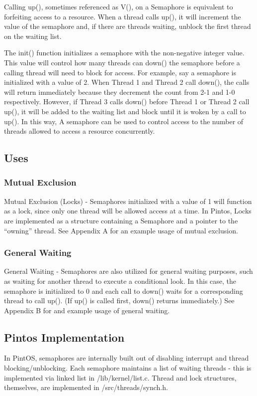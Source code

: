 \documentclass[11pt, letterpaper]{article}
\begin{document}
Calling up(), sometimes referenced as V(), on a Semaphore is equivalent to forfeiting access to a resource. When a thread calls up(), it will increment the value of the semaphore and, if there are threads waiting, unblock the first thread on the waiting list.

The init() function initializes a semaphore with the non-negative integer value. This value will control how many threads can down() the semaphore before a calling thread will need to block for access. For example, say a semaphore is initialized with a value of 2. When Thread 1 and Thread 2 call down(), the calls will return immediately because they decrement the count from 2-1 and 1-0 respectively. However, if Thread 3 calls down() before Thread 1 or Thread 2 call up(), it will be added to the waiting list and block until it is woken by a call to up(). In this way, A semaphore can be used to control access to the number of threads allowed to access a resource concurrently.


\subsection{Uses}

\subsubsection{Mutual Exclusion}
Mutual Exclusion (Locks) - Semaphores initialized with a value of 1 will function as a lock, since only one thread will be allowed access at a time. In Pintos, Locks are implemented as a structure containing a Semaphore and a pointer to the “owning” thread. See Appendix A for an example usage of mutual exclusion.


\subsubsection{General Waiting}
General Waiting - Semaphores are also utilized for general waiting purposes, such as waiting for another thread to execute a conditional look. In this case, the semaphore is initialized to 0 and each call to down() waits for a corresponding thread to call up(). (If up() is called first, down() returns immediately.) See Appendix B for and example usage of general waiting.

\subsection{Pintos Implementation}
In PintOS, semaphores are internally built out of disabling interrupt and thread blocking/unblocking. Each semaphore maintains a list of waiting threads - this is implemented via linked list in /lib/kernel/list.c.
Thread and lock structures, themselves, are implemented in /src/threads/synch.h.
\end{document}
